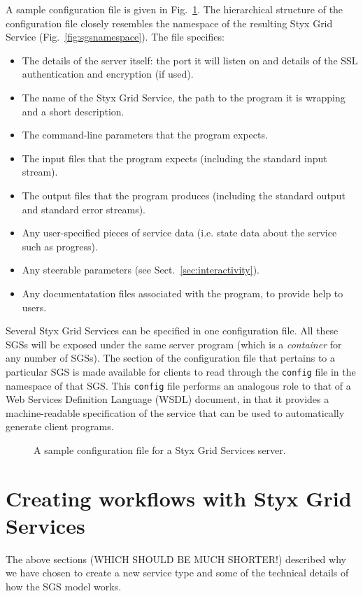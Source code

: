 \documentclass{llncs}
\begin{document}
A sample configuration file is given in Fig.~\ref{fig:configfile}.  The hierarchical structure of the configuration file closely resembles the namespace of the resulting Styx Grid Service (Fig.~\ref{fig:sgsnamespace}).  The file specifies:
\begin{itemize}
	\item The details of the server itself: the port it will listen on and details of the SSL authentication and encryption (if used).
	\item The name of the Styx Grid Service, the path to the program it is wrapping and a short description.
	\item The command-line parameters that the program expects.
	\item The input files that the program expects (including the standard input stream).
	\item The output files that the program produces (including the standard output and standard error streams).
	\item Any user-specified pieces of service data (i.e. state data about the service such as progress).
	\item Any steerable parameters (see Sect.~\ref{sec:interactivity}).
	\item Any documentatation files associated with the program, to provide help to users.
\end{itemize}
Several Styx Grid Services can be specified in one configuration file.  All these SGSs will be exposed under the same server program (which is a {\em container\/} for any number of SGSs).  The section of the configuration file that pertains to a particular SGS is made available for clients to read through the {\tt config} file in the namespace of that SGS.  This {\tt config} file performs an analogous role to that of a Web Services Definition Language (WSDL) document, in that it provides a machine-readable specification of the service that can be used to automatically generate client programs.

\begin{figure}
\caption{A sample configuration file for a Styx Grid Services server.}\label{fig:configfile}
\end{figure}
%
\section{Creating workflows with Styx Grid Services}
The above sections (WHICH SHOULD BE MUCH SHORTER!) described why we have chosen to create a new service type and some of the technical details of how the SGS model works.
\end{document}
